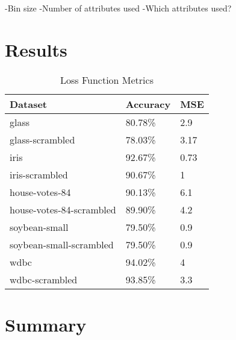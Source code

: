 \documentclass[twoside,11pt]{article}
\begin{document}
-Bin size \newline
-Number of attributes used \newline
-Which attributes used? \newline

\section{Results}

\begin{table}[h]
	\centering
	\caption{Loss Function Metrics} \label{tab:metrics}
	\begin{tabular}{|l|l|l|}
		\hline
		Dataset                  & Accuracy & MSE  \\ \hline
		glass                    & 80.78\%  & 2.9  \\ \hline
		glass-scrambled          & 78.03\%  & 3.17 \\ \hline
		iris                     & 92.67\%  & 0.73 \\ \hline
		iris-scrambled           & 90.67\%  & 1    \\ \hline
		house-votes-84           & 90.13\%  & 6.1  \\ \hline
		house-votes-84-scrambled & 89.90\%  & 4.2  \\ \hline
		soybean-small            & 79.50\%  & 0.9  \\ \hline
		soybean-small-scrambled  & 79.50\%  & 0.9  \\ \hline
		wdbc                     & 94.02\%  & 4    \\ \hline
		wdbc-scrambled           & 93.85\%  & 3.3  \\ \hline
	\end{tabular}
\end{table}

\section{Summary}


\end{document}
